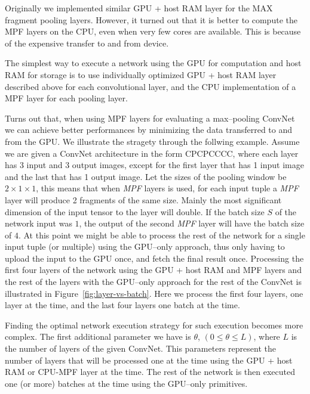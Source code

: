 \documentclass[conference]{./IEEEtran/IEEEtran}
\begin{document}
  Originally we implemented similar GPU + host RAM layer for the MAX
  fragment pooling layers.  However, it turned out that it is better
  to compute the MPF layers on the CPU, even when very few cores are
  available. This is because of the expensive transfer to and from
  device.

  The simplest way to execute a network using the GPU for computation
  and host RAM for storage is to use individually optimized GPU + host
  RAM layer described above for each convolutional layer, and the CPU
  implementation of a MPF layer for each pooling layer.

  Turns out that, when using MPF layers for evaluating a max--pooling
  ConvNet we can achieve better performances by minimizing the data
  transferred to and from the GPU.  We illustrate the stragety through
  the follwing example.  Assume we are given a ConvNet architecture in
  the form CPCPCCCC, where each layer has 3 input and 3 output
  images, except for the first layer that has 1 input
  image and the last that has 1 output image.  Let the
  sizes of the pooling window be $2 \times 1 \times 1$, this means
  that when \emph{MPF} layers is used, for each input tuple a
  \emph{MPF} layer will produce 2 fragments of the same size.  Mainly
  the most significant dimension of the input tensor to the layer will
  double.  If the batch size $S$ of the network input was $1$, the
  output of the second \emph{MPF} layer will have the batch size of
  $4$.  At this point we might be able to process the rest of the
  network for a single input tuple (or multiple) using the GPU--only
  approach, thus only having to upload the input to the GPU once, and
  fetch the final result once.  Processing the first four layers of
  the network using the GPU + host RAM and MPF layers and the rest of
  the layers with the GPU--only approach for the rest of the ConvNet
  is illustrated in Figure~\ref{fig:layer-vs-batch}.  Here we process
  the first four layers, one layer at the time, and the last four
  layers one batch at the time.

  Finding the optimal network execution strategy for such execution
  becomes more complex.  The first additional parameter we have is
  $\theta$, $(0 \le \theta \le L)$, where $L$ is the number of layers
  of the given ConvNet.  This parameters represent the number of
  layers that will be processed one at the time using the GPU + host
  RAM or CPU-MPF layer at the time.  The rest of the network is then
  executed one (or more) batches at the time using the GPU--only
  primitives.
\end{document}

